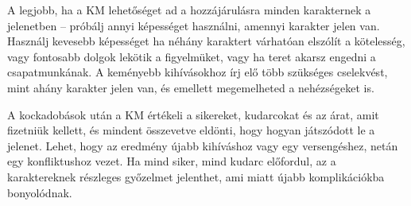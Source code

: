 A legjobb, ha a KM lehetőséget ad a hozzájárulásra minden karakternek a jelenetben – próbálj annyi képességet használni, amennyi karakter jelen van. Használj kevesebb képességet ha néhány karaktert várhatóan elszólít a kötelesség, vagy fontosabb dolgok lekötik a figyelmüket, vagy ha teret akarsz engedni a csapatmunkának. A keményebb kihívásokhoz írj elő több szükséges cselekvést, mint ahány karakter jelen van, és emellett megemelheted a nehézségeket is.

A kockadobások után a KM értékeli a sikereket, kudarcokat és az árat, amit fizetniük kellett, és mindent összevetve eldönti, hogy hogyan játszódott le a jelenet. Lehet, hogy az eredmény újabb kihíváshoz vagy egy versengéshez, netán egy konfliktushoz vezet. Ha mind siker, mind kudarc előfordul, az a karaktereknek részleges győzelmet jelenthet, ami miatt újabb komplikációkba bonyolódnak.
